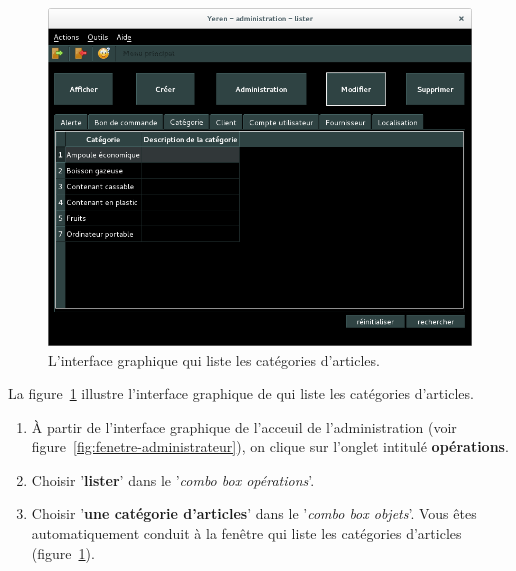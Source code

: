 
\newpage
{}\label{sec:administration-categorie-lister}

\begin{figure}[!htpb]
	\centering
	\includegraphics[scale=0.45]{images/categorie-articles-lister.png}
	\caption{L'interface graphique qui liste les cat\'egories d'articles.}
	\label{fig:admin-categories-articles-lister}
\end{figure}

La figure~\ref{fig:admin-categories-articles-lister} illustre
l'interface graphique de \yeroth qui liste les cat\'egories
d'articles.

\begin{enumerate}[1)]
	\item \`A partir de l'interface graphique de l'acceuil de
		l'administration (voir figure~\ref{fig:fenetre-administrateur}),
		on clique sur l'onglet intitul\'e \textbf{op\'erations}. 
		
	\item Choisir '\textbf{lister}' dans le '\emph{combo box
		op\'erations}'.
		
	\item Choisir '\textbf{une cat\'egorie d'articles}' dans
		le '\emph{combo box objets}'. Vous \^etes automatiquement
		conduit \`a la fen\^etre qui liste les cat\'egories
		d'articles (figure~\ref{fig:admin-categories-articles-lister}).
\end{enumerate}

